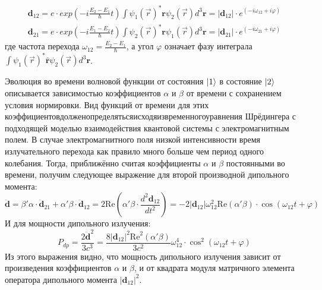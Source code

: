 \documentclass[a4paper, 12pt]{article}
\begin{document}
\begin{equation}
\begin{aligned}
\textbf{d}_{12} = {e}\cdot exp(-{i}\frac{{E}_2-{E}_1}{\hbar}t)\int\psi_{1}(\vec{{r}})^{*}\textbf{r}\psi_{2}(\vec{{r}})d^3\textbf{r}=|\textbf{d}_{12}|\cdot{e}^{(-{i\omega}_{12}+i\varphi)}\\
\textbf{d}_{21} ={e}\cdot exp(-{i}\frac{{E}_1-{E}_2}{\hbar}t)\int\psi_{2}(\vec{{r}})^{*}\textbf{r}\psi_{1}(\vec{{r}})d^3\textbf{r}=|\textbf{d}_{21}|\cdot{e}^{(-{i\omega}_{21}+i\varphi)}
\end{aligned}
\end{equation}
где частота перехода $\omega_{12}=\frac{E_2-E_1}{\hbar}$, а угол $\varphi$ означает фазу интеграла $\int\psi_1(\vec{r})^*\hat{\textbf{r}}\psi_2(\vec{r})d^3\textbf{r}$.

Эволюция во времени волновой функции от состояния $\ket{1}$ в состояние $\ket{2}$ описывается зависимостью коэффициентов $\alpha$ и $\beta$ от времени с сохранением условия нормировки. Вид функций от времени для этих коэффициентовдолженопределятьсяисходяизвременногоуравнения Шрёдингера с подходящей моделью взаимодействия квантовой системы с электромагнитным полем. В случае электромагнитного поля низкой интенсивности время излучательного перехода как правило много больше чем период одного колебания. Тогда, приближённо считая коэффициенты $\alpha$ и $\beta$ постоянными во времени, получим следующее выражение для второй производной дипольного момента:
\begin{equation}
	\ddot{\textbf{d}}=\beta'\alpha\cdot\ddot{\textbf{d}}_{21}+\alpha'\beta\cdot\ddot{\textbf{d}}_{12}=2\text{Re}\left(\alpha'\beta\cdot\frac{d^2\textbf{d}_{12}}{dt^2}\right)=-2|\textbf{d}_{12}|\omega^2_{12}\text{Re}(\alpha'\beta)\cdot\cos(\omega_{12}t+\varphi)
\end{equation}
И для мощности дипольного излучения:
\begin{equation}
	P_{dp}=\frac{2\ddot{\textbf{d}}^2}{3c^3}=\frac{8|\textbf{d}_{12}|^2\text{Re}^2(\alpha'\beta)}{3c^2}\omega_{12}^4\cdot\cos^2(\omega_{12}t+\varphi)
\end{equation}
Из этого выражения видно, что мощность дипольного излучения зависит от произведения коэффициентов $\alpha$ и $\beta$, и от квадрата модуля матричного элемента оператора дипольного момента $|\textbf{d}_{12}|^2$.
\end{document}
